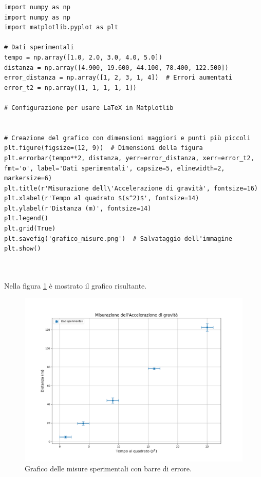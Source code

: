 \documentclass[a4paper,12pt]{article}
\begin{document}
\begin{lstlisting}[caption={Grafico delle misure sperimentali con barre di errore}]
import numpy as np
import numpy as np
import matplotlib.pyplot as plt

# Dati sperimentali
tempo = np.array([1.0, 2.0, 3.0, 4.0, 5.0])
distanza = np.array([4.900, 19.600, 44.100, 78.400, 122.500])
error_distanza = np.array([1, 2, 3, 1, 4])  # Errori aumentati
error_t2 = np.array([1, 1, 1, 1, 1])

# Configurazione per usare LaTeX in Matplotlib


# Creazione del grafico con dimensioni maggiori e punti più piccoli
plt.figure(figsize=(12, 9))  # Dimensioni della figura
plt.errorbar(tempo**2, distanza, yerr=error_distanza, xerr=error_t2, fmt='o', label='Dati sperimentali', capsize=5, elinewidth=2, markersize=6)
plt.title(r'Misurazione dell\'Accelerazione di gravità', fontsize=16)
plt.xlabel(r'Tempo al quadrato $(s^2)$', fontsize=14)
plt.ylabel(r'Distanza (m)', fontsize=14)
plt.legend()
plt.grid(True)
plt.savefig('grafico_misure.png')  # Salvataggio dell'immagine
plt.show()



\end{lstlisting}

Nella figura \ref{fig:grafico_misure} è mostrato il grafico risultante.

\begin{figure}[h!]
    \centering
    \includegraphics[width=\textwidth]{grafico_misure.png}
    \caption{Grafico delle misure sperimentali con barre di errore.}
    \label{fig:grafico_misure}
\end{figure}
\end{document}
